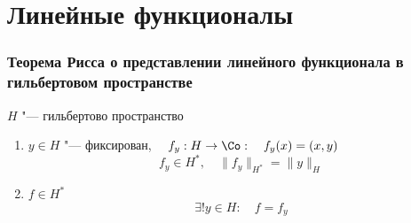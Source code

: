 \part{Линейные функционалы}

\section{Теорема Рисса о представлении линейного функционала в гильбертовом пространстве}

\begin{theorem}[Рисс]
	$ H $ "--- гильбертово пространство

	\begin{enumerate}
		\item $ y \in H $ "--- фиксирован, $ \quad f_y : H \to \Co : \quad f_y(x) = (x, y) $
			$$ f_y \in H^*, \quad \|f_y\|_{H^*} = \|y\|_H $$
		\item $ f \in H^* $
			$$ \exists ! y \in H : \quad f = f_y $$
	\end{enumerate}
\end{theorem}

